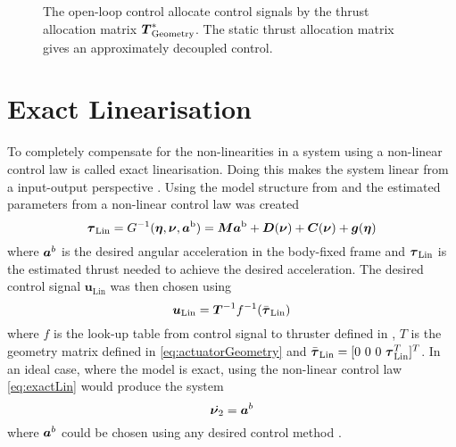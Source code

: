 \begin{figure}
    \centering
    \caption{The open-loop control allocate control signals by the thrust allocation matrix $\thrusterGeometryOnes[*]$. The static thrust allocation matrix gives an approximately decoupled control.}
    \label{fig:open_control}
\end{figure}

\section{Exact Linearisation}
To completely compensate for the non-linearities in a system using a non-linear control law is called exact linearisation. Doing this makes the system linear from a input-output perspective \citep{reglerteori}. Using the model structure from  and the estimated parameters from  a non-linear control law was created 
\begin{equation}\label{eq:exactLin}
\tauVector_{\text{Lin}} = G^{-1}(\etaVector,\nuVector,\accVector^{\text{b}}) = \inertia \accVector^{\text{b}} + \damping(\nuVector) + \coriolis(\nuVector) + \gravity(\etaVector)
\end{equation}
where $\accVector^b$ is the desired angular acceleration in the body-fixed frame and $\tauVector_{\text{Lin}}$ is the estimated thrust needed to achieve the desired acceleration.
The desired control signal $\boldsymbol{u}_{\text{Lin}}$ was then chosen using 
\begin{equation}\label{eq:linControlSignal}
\boldsymbol{u}_{\text{Lin}} = \boldsymbol{T}^{-1}f^{-1}(\bar{\tauVector}_{\text{Lin}})
\end{equation} where $f$ is the look-up table from control signal to thruster defined in , $T$ is the geometry matrix defined in \eqref{eq:actuatorGeometry} and $\bar{\tauVector}_{\text{Lin}}=[0~0~0~\tauVector_{\text{Lin}}^T]^T$.
In an ideal case, where the model is exact, using the non-linear control law \eqref{eq:exactLin} would produce the system
\begin{equation}\label{eq:exactLinSys}
\dot{\nuVectorAng} = \accVector^b
\end{equation} 
where $\accVector^b$ could be chosen using any desired control method \citep[p.451]{fossen2011}.

